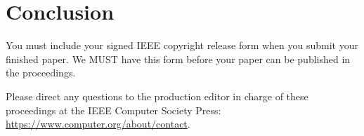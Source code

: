 \documentclass[10pt,twocolumn,letterpaper]{article}
\begin{document}
\section{Conclusion}

You must include your signed IEEE copyright release form when you submit your finished paper.
We MUST have this form before your paper can be published in the proceedings.

Please direct any questions to the production editor in charge of these proceedings at the IEEE Computer Society Press:
\url{https://www.computer.org/about/contact}.

\cite{Authors14}

\cite{Alpher02,Alpher03,Alpher05,Authors14b,Authors14}

{\small


}
\end{document}
